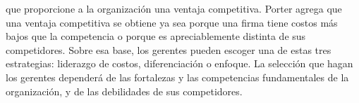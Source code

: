 \begin{enumerate}
\begin{itemize}
			que proporcione a la organizaci\'on una ventaja competitiva. Porter agrega que una ventaja competitiva se obtiene ya sea porque una
			firma tiene costos m\'as bajos que la competencia o porque es apreciablemente distinta de sus competidores. Sobre esa base, los
			gerentes pueden escoger una de estas tres estrategias: liderazgo de costos, diferenciaci\'on o enfoque. La selecci\'on que hagan los
			gerentes depender\'a de las fortalezas y las competencias fundamentales de la organizaci\'on, y de las debilidades de sus competidores.
	\end{itemize}



\end{enumerate}
